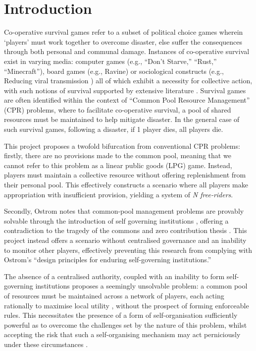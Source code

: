 \chapter{Introduction}\label{introduction}

Co-operative survival games refer to a subset of political choice games wherein `players' must work together to overcome disaster, else suffer the consequences through both personal and communal damage. Instances of co-operative survival exist in varying media: computer games (e.g., ``Don't Starve,'' ``Rust,'' ``Minecraft''), board games (e.g., Ravine) or sociological constructs (e.g., Reducing viral transmission ) all of which exhibit a necessity for collective action, with such notions of survival supported by extensive literature \cite{su10030652}. Survival games are often identified within the context of ``Common Pool Resource Management'' (CPR) \cite{ostromCollectiveAction} \cite{smartHome} problems, where to facilitate co-operative survival, a pool of shared resources must be maintained to help mitigate disaster. In the general case of such survival games, following a disaster, if 1 player dies, all players die.

This project proposes a twofold bifurcation from conventional CPR problems: firstly, there are no provisions made to the common pool, meaning that we cannot refer to this problem as a linear public goods (LPG) game. Instead, players must maintain a collective resource without offering replenishment from their personal pool. This effectively constructs a scenario where all players make appropriation with insufficient provision, yielding a system of \textit{N free-riders}. 

Secondly, Ostrom notes that common-pool management problems are provably solvable through the introduction of self governing institutions \cite{ostromCollectiveAction}, offering a contradiction to the tragedy of the commons and zero contribution thesis \cite{zeroCon}. This project instead offers a scenario without centralised governance and an inability to monitor other players, effectively preventing this research from complying with Ostrom’s ``design principles for enduring self-governing institutions.''

The absence of a centralised authority, coupled with an inability to form self-governing institutions proposes a seemingly unsolvable problem: a common pool of resources must be maintained across a network of players, each acting rationally to maximise local utility \cite{oberUtil}, without the prospect of forming enforceable rules. This necessitates the presence of a form of self-organisation sufficiently powerful as to overcome the challenges set by the nature of this problem, whilst accepting the risk that such a self-organising mechanism may act perniciously under these circumstances \cite{dobSteg}.

